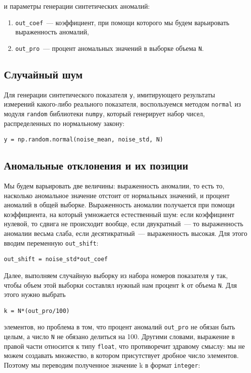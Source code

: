 \documentclass[a4paper,12pt]{article}
\begin{document}
\medskip\noindent
и параметры генерации синтетических аномалий:

\medskip\noindent
\begin{enumerate}
	\item \texttt{out\_coef} — коэффициент, при помощи которого мы будем варьировать выраженность аномалий,
	\item \texttt{out\_pro} — процент аномальных значений в выборке объема \texttt{N}.
\end{enumerate}

\subsection{Случайный шум}

Для генерации синтетического показателя \texttt{y}, имитирующего результаты измерений какого-либо реального показателя, воспользуемся методом \texttt{normal} из модуля \texttt{random} библиотеки \texttt{numpy}, который генерирует набор чисел, распределенных по нормальному закону:
\begin{verbatim}
y = np.random.normal(noise_mean, noise_std, N)
\end{verbatim}

\subsection{Аномальные отклонения и их позиции}

Мы будем варьировать две величины: выраженность аномалии, то есть то, насколько аномальное значение отстоит от нормальных значений, и процент аномалий в общей выборке. Выраженность аномалии получается при помощи коэффициента, на который умножается естественный шум: если коэффициент нулевой, то сдвига не происходит вообще, если двукратный — то выраженность аномалии весьма слаба, если десятикратный — выраженность высокая. Для этого вводим переменную \texttt{out\_shift}:

\begin{verbatim}
out_shift = noise_std*out_coef
\end{verbatim}

Далее, выполняем случайную выборку из набора номеров показателя \texttt{y} так, чтобы объем этой выборки составлял нужный нам процент \texttt{k} от объема \texttt{N}. Для этого нужно выбрать 

\begin{verbatim}
k = N*(out_pro/100)
\end{verbatim}
элементов, но проблема в том, что процент аномалий \texttt{out\_pro} не обязан быть целым, а число \texttt{N} не обязано делиться на 100. Другими словами, выражение в правой части относится к типу \texttt{float}, что противоречит здравому смыслу: мы не можем создавать множество, в котором присутствует дробное число элементов. Поэтому мы переводим полученное значение k в формат \texttt{integer}:
\end{document}
